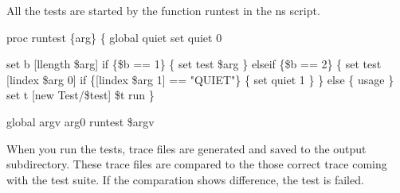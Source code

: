 All the tests are started by the function runtest in the ns script.

\begin{program}
   proc runtest \{arg\} \{
     global quiet
     set quiet 0

     set b [llength \$arg]
     if \{\$b == 1\} \{
        set test \$arg
     \} elseif \{\$b == 2\} \{
        set test [lindex \$arg 0]
        if \{[lindex \$arg 1] == "QUIET"\} \{
         set quiet 1
        \}
      \} else \{
         usage
     \}
     set t [new Test/\$test]
     \$t run
\}

global argv arg0
runtest \$argv
\end{program}


When you run the tests, trace files are generated and saved to the output 
subdirectory. These trace files are compared to the those correct trace coming 
with the test suite. If the comparation shows difference, the test is failed. 





